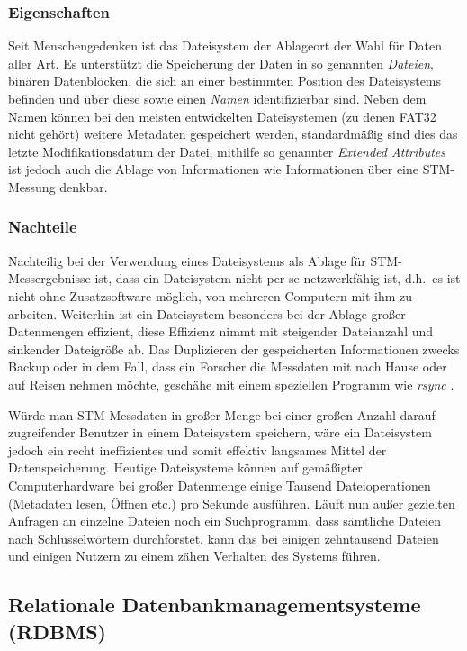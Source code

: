 \documentclass[12pt,ngerman,a4]{scrartcl}
\newcommand{\pquote}[1]{\glqq #1\grqq}
\begin{document}
\subsubsection{Eigenschaften}
Seit Menschengedenken ist das Dateisystem der Ablageort der Wahl für Daten aller Art. Es unterstützt die Speicherung der Daten in so genannten \emph{Dateien}, binären Datenblöcken, die sich an einer bestimmten Position des Dateisystems befinden und über diese sowie einen \emph{Namen} identifizierbar sind. Neben dem Namen können bei den meisten entwickelten Dateisystemen (zu denen FAT32 nicht gehört) weitere Metadaten gespeichert werden, standardmäßig sind dies das letzte Modifikationsdatum der Datei, mithilfe so genannter \emph{Extended Attributes} ist jedoch auch die Ablage von Informationen wie Informationen über eine STM-Messung denkbar.
\subsubsection{Nachteile}
Nachteilig bei der Verwendung eines Dateisystems als Ablage für STM-\linebreak Messergebnisse ist, dass ein Dateisystem nicht per se netzwerkfähig ist, d.h.\ es ist nicht ohne Zusatzsoftware möglich, von mehreren Computern mit ihm zu arbeiten. Weiterhin ist ein Dateisystem besonders bei der Ablage großer Datenmengen effizient, diese Effizienz nimmt mit steigender Dateianzahl und sinkender Dateigröße ab. Das Duplizieren der gespeicherten Informationen zwecks Backup oder in dem Fall, dass ein Forscher die Messdaten mit nach Hause oder auf Reisen nehmen möchte, geschähe mit einem speziellen Programm wie \emph{rsync} \cite{manrsync}.

Würde man STM-Messdaten in großer Menge bei einer großen Anzahl darauf zugreifender Benutzer in einem Dateisystem speichern, wäre ein Dateisystem jedoch ein recht ineffizientes und somit effektiv langsames Mittel der Datenspeicherung. Heutige Dateisysteme können auf gemäßigter Computerhardware bei großer Datenmenge einige Tausend Dateioperationen (Metadaten lesen, Öffnen etc.) pro Sekunde ausführen. %
Läuft nun außer gezielten Anfragen an einzelne Dateien noch ein Suchprogramm, %
dass sämtliche Dateien nach Schlüsselwörtern durchforstet, kann das bei einigen zehntausend Dateien und einigen Nutzern zu einem \pquote{zähen} Verhalten des Systems führen.
\subsection{Relationale Datenbankmanagementsysteme (RDBMS)}
\end{document}
